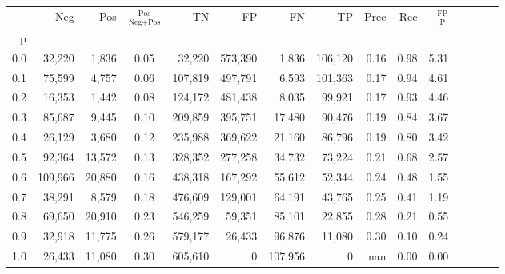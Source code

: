 \begin{tabular}{rrrcrrrrrrrrrrr}
\toprule
{} &      Neg &     Pos & $\frac{\text{Pos}}{\text{Neg}+\text{Pos}}$ &       TN &       FP &       FN &       TP &  Prec &   Rec & $\frac{\text{FP}}{\text{P}}$ \\
p   &          &         &                                            &          &          &          &          &       &       &                              \\
\midrule
0.0 &   32,220 &   1,836 &                                       0.05 &   32,220 &  573,390 &    1,836 &  106,120 &  0.16 &  0.98 &                         5.31 \\
0.1 &   75,599 &   4,757 &                                       0.06 &  107,819 &  497,791 &    6,593 &  101,363 &  0.17 &  0.94 &                         4.61 \\
0.2 &   16,353 &   1,442 &                                       0.08 &  124,172 &  481,438 &    8,035 &   99,921 &  0.17 &  0.93 &                         4.46 \\
0.3 &   85,687 &   9,445 &                                       0.10 &  209,859 &  395,751 &   17,480 &   90,476 &  0.19 &  0.84 &                         3.67 \\
0.4 &   26,129 &   3,680 &                                       0.12 &  235,988 &  369,622 &   21,160 &   86,796 &  0.19 &  0.80 &                         3.42 \\
0.5 &   92,364 &  13,572 &                                       0.13 &  328,352 &  277,258 &   34,732 &   73,224 &  0.21 &  0.68 &                         2.57 \\
0.6 &  109,966 &  20,880 &                                       0.16 &  438,318 &  167,292 &   55,612 &   52,344 &  0.24 &  0.48 &                         1.55 \\
0.7 &   38,291 &   8,579 &                                       0.18 &  476,609 &  129,001 &   64,191 &   43,765 &  0.25 &  0.41 &                         1.19 \\
0.8 &   69,650 &  20,910 &                                       0.23 &  546,259 &   59,351 &   85,101 &   22,855 &  0.28 &  0.21 &                         0.55 \\
0.9 &   32,918 &  11,775 &                                       0.26 &  579,177 &   26,433 &   96,876 &   11,080 &  0.30 &  0.10 &                         0.24 \\
1.0 &   26,433 &  11,080 &                                       0.30 &  605,610 &        0 &  107,956 &        0 &   nan &  0.00 &                         0.00 \\
\bottomrule
\end{tabular}
